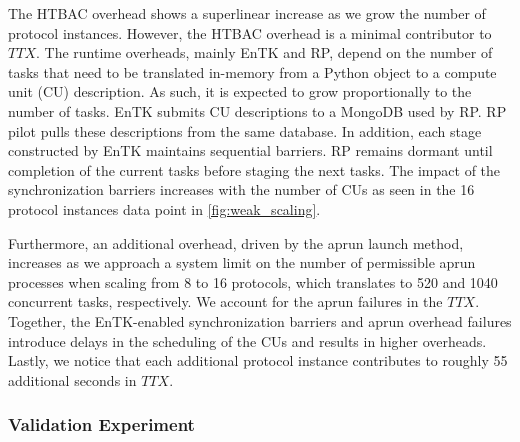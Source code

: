 The HTBAC overhead shows a superlinear increase as we grow the number of protocol
instances. However, the HTBAC overhead is a minimal contributor to \(TTX\).
The runtime overheads, mainly EnTK and RP, depend on the number of tasks that need to
be translated in-memory from a Python object to a compute unit (CU) description.
As such, it is expected to grow proportionally to the number of tasks. EnTK
submits CU descriptions to a MongoDB used by RP. RP pilot pulls these
descriptions from the same database. 
In addition, each stage constructed by EnTK maintains sequential barriers. 
RP remains dormant until completion of the current tasks before staging
the next tasks. The impact of the synchronization barriers increases with the
number of CUs as seen in the 16 protocol instances data point in
\ref{fig:weak_scaling}.

Furthermore, an additional overhead, driven by the aprun launch method,
increases as we approach a system limit on the number of permissible aprun
processes when scaling from 8 to 16 protocols, which translates to 520 and
1040 concurrent tasks, respectively. We account for the aprun failures in the
\(TTX\). Together, the EnTK-enabled synchronization barriers and aprun
overhead failures introduce delays in the scheduling of the CUs and results in
higher overheads. Lastly, we notice that each additional protocol instance
contributes to roughly 55 additional seconds in \(TTX\). 







\subsubsection{Validation Experiment}

